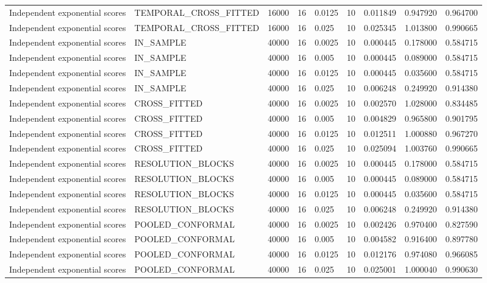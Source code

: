 \begin{tabular}{lllllllll}
Independent exponential scores & TEMPORAL\_CROSS\_FITTED & 16000 & 16 & 0.0125 & 10 & 0.011849 & 0.947920 & 0.964700 \\
Independent exponential scores & TEMPORAL\_CROSS\_FITTED & 16000 & 16 & 0.025 & 10 & 0.025345 & 1.013800 & 0.990665 \\
Independent exponential scores & IN\_SAMPLE & 40000 & 16 & 0.0025 & 10 & 0.000445 & 0.178000 & 0.584715 \\
Independent exponential scores & IN\_SAMPLE & 40000 & 16 & 0.005 & 10 & 0.000445 & 0.089000 & 0.584715 \\
Independent exponential scores & IN\_SAMPLE & 40000 & 16 & 0.0125 & 10 & 0.000445 & 0.035600 & 0.584715 \\
Independent exponential scores & IN\_SAMPLE & 40000 & 16 & 0.025 & 10 & 0.006248 & 0.249920 & 0.914380 \\
Independent exponential scores & CROSS\_FITTED & 40000 & 16 & 0.0025 & 10 & 0.002570 & 1.028000 & 0.834485 \\
Independent exponential scores & CROSS\_FITTED & 40000 & 16 & 0.005 & 10 & 0.004829 & 0.965800 & 0.901795 \\
Independent exponential scores & CROSS\_FITTED & 40000 & 16 & 0.0125 & 10 & 0.012511 & 1.000880 & 0.967270 \\
Independent exponential scores & CROSS\_FITTED & 40000 & 16 & 0.025 & 10 & 0.025094 & 1.003760 & 0.990665 \\
Independent exponential scores & RESOLUTION\_BLOCKS & 40000 & 16 & 0.0025 & 10 & 0.000445 & 0.178000 & 0.584715 \\
Independent exponential scores & RESOLUTION\_BLOCKS & 40000 & 16 & 0.005 & 10 & 0.000445 & 0.089000 & 0.584715 \\
Independent exponential scores & RESOLUTION\_BLOCKS & 40000 & 16 & 0.0125 & 10 & 0.000445 & 0.035600 & 0.584715 \\
Independent exponential scores & RESOLUTION\_BLOCKS & 40000 & 16 & 0.025 & 10 & 0.006248 & 0.249920 & 0.914380 \\
Independent exponential scores & POOLED\_CONFORMAL & 40000 & 16 & 0.0025 & 10 & 0.002426 & 0.970400 & 0.827590 \\
Independent exponential scores & POOLED\_CONFORMAL & 40000 & 16 & 0.005 & 10 & 0.004582 & 0.916400 & 0.897780 \\
Independent exponential scores & POOLED\_CONFORMAL & 40000 & 16 & 0.0125 & 10 & 0.012176 & 0.974080 & 0.966085 \\
Independent exponential scores & POOLED\_CONFORMAL & 40000 & 16 & 0.025 & 10 & 0.025001 & 1.000040 & 0.990630 \\

\end{tabular}
